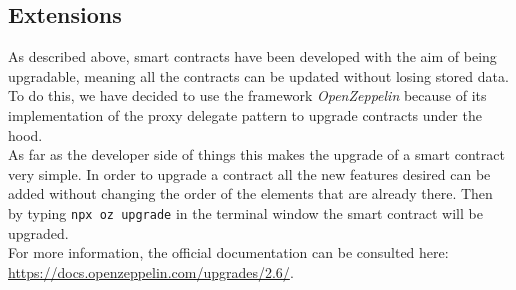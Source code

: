 \subsection{Extensions}  %
As described above, smart contracts have been developed with the aim of being upgradable, meaning all the contracts can be updated without losing stored data. \\
To do this, we have decided to use the framework \textit{OpenZeppelin} because of its implementation of the proxy delegate pattern to upgrade contracts under the hood. \\
As far as the developer side of things this makes the upgrade of a smart contract very simple. In order to upgrade a contract all the new features desired can be added without changing the order of the elements that are already there. Then by typing \texttt{npx oz upgrade} in the terminal window the smart contract will be upgraded. \\
For more information, the official documentation can be consulted here: \url{https://docs.openzeppelin.com/upgrades/2.6/}.
